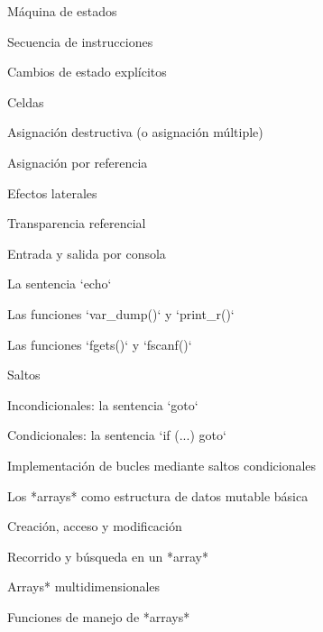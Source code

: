 \begin{longenum}
\begin{longenum}
\begin{longenum}
            \item Máquina de estados
            \item Secuencia de instrucciones
        \end{longenum}
        \item Cambios de estado explícitos
        \begin{longenum}
            \item Celdas
            \item Asignación destructiva (o asignación múltiple)
            \item Asignación por referencia
        \end{longenum}
        \item Efectos laterales
        \begin{longenum}
            \item Transparencia referencial
            \item Entrada y salida por consola
            \begin{longenum}
                \item La sentencia `echo`
                \item Las funciones `var_dump()` y `print_r()`
                \item Las funciones `fgets()` y `fscanf()`
            \end{longenum}
        \end{longenum}
        \item Saltos
        \begin{longenum}
            \item Incondicionales: la sentencia `goto`
            \item Condicionales: la sentencia `if (...) goto`
            \item Implementación de bucles mediante saltos condicionales
        \end{longenum}
        \item Los *arrays* como estructura de datos mutable básica
        \begin{longenum}
            \item Creación, acceso y modificación
            \item Recorrido y búsqueda en un *array*
            \item *Arrays* multidimensionales
            \item Funciones de manejo de *arrays*
        \end{longenum}
    \end{longenum}

\end{longenum}
